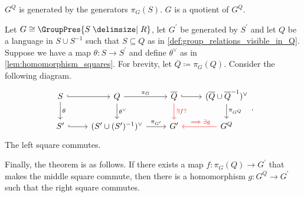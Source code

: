 \begin{remark}
	$G^Q$ is generated by the generators $\pi_G(S)$.  $G$ is a quotient of  $G^Q$.
\end{remark}

\begin{theorem}
	Let $G \cong \GroupPres{S \relations R}$, let  $G^\prime$ be generated by $S^\prime$ and let $Q$ be a language in  $S \cup S^{-1}$ such that $S \subseteq Q$ as in \cref{def:group_relations_visible_in_Q}.
	Suppose we have a map $\theta \colon S \to S^\prime$ and define $\theta^\vee$ as in \cref{lem:homomorphism_squares}.
	For brevity, let $\overline{Q} \coloneqq \pi_G(Q)$.
	Consider the following diagram.
	\[
		\begin{tikzcd}
			S \ar[d, "\theta"] \ar[r, hook] & Q \ar[d, "\theta^\vee"] \ar[r, "\pi_G"] & \overline{Q} \ar[d, color=red, "\exists f ?"] \ar[r, hook] & (\overline{Q} \cup \overline{Q}^{-1})^\vee \ar[d, "\pi_{G^Q}"]\\
			S^\prime \ar[r, hook] & (S^\prime \cup (S^\prime)^{-1})^\vee \ar[r, "\pi_{G^\prime}"] & G^\prime & G^Q \ar[l, color=red, "\implies \exists g"']
		\end{tikzcd}
		.\]
	The left square commutes.

	Finally, the theorem is as follows.
	If there exists a map $f \colon \pi_G(Q) \to G^\prime$ that makes the middle square commute, then there is a homomorphism $g \colon G^Q \to G^\prime$ such that the right square commutes.
	\label{thm:commuting_diagram_GQ}
\end{theorem}
